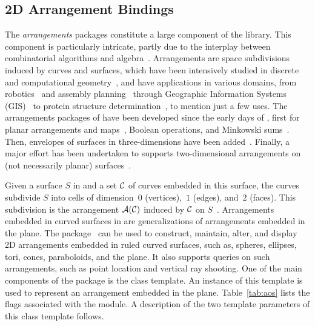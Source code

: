 \subsection{2D Arrangement Bindings}
\label{ssec:modules:aos2}
The \cgal{} \emph{arrangements} packages constitute a large component
of the \cgal{} library. This component is particularly intricate,
partly due to the interplay between combinatorial algorithms and
algebra~\cite{fhw-caass-12}. Arrangements are space subdivisions
induced by curves and surfaces, which have been intensively studied in
discrete and computational geometry~\cite{hs-a-18}, and have
applications in various domains, from robotics~\cite{my-hs-atarr-95}
and assembly planning~\cite{hlw-gfapm-00} through Geographic
Information Systems (GIS)~\cite{DBLP:conf/gis/KreveldSW04} to protein
structure determination~\cite{DBLP:journals/jcb/MartinYBZD11}, to
mention just a few uses. The arrangements packages of \cgal{} have
been developed since the early days of \cgal, first for planar
arrangements and maps~\cite{DBLP:journals/jea/FlatoHHNE00,
  DBLP:journals/comgeo/WeinFZH07}, Boolean operations, and Minkowski
sums~\cite{bfhhm-epsph-15}. Then, envelopes of surfaces in
three-dimensions have been added~\cite{m-rgece-06}. Finally, a major
effort has been undertaken to supports two-dimensional arrangements on
(not necessarily planar)
surfaces~\cite{bfhks-apsca-10,bfhmw-apsgf-10}.

Given a surface $S$ in \Rthree{} and a set ${\cal C}$ of curves embedded
in this surface, the curves subdivide $S$ into cells of dimension~$0$
(vertices),~$1$ (edges), and~$2$ (faces). This subdivision is the
arrangement ${\cal A}({\cal C})$ induced by ${\cal C}$ on
$S$~\cite{fhw-caass-12}. Arrangements embedded in curved surfaces in
\Rthree{} are generalizations of arrangements embedded in the
plane. The \iiDArrangementsPackage{} package~\cite{cgal:wfzh-a2-21a}
can be used to construct, maintain, alter, and display 2D arrangements
embedded in ruled curved surfaces, such as, spheres, ellipses, tori,
cones, paraboloids, and the plane. It also supports queries on such arrangements,
such as point location and vertical ray shooting. One of the main
components of the \iiDArrangementsPackage{} package is the
 class template. An
instance of this template is used to represent an arrangement embedded
in the plane.  Table~\ref{tab:aos} lists the \cmake{} flags associated
with the \iiDArrangementsPackage{} module.
A description of the two template parameters of this class template follows.

